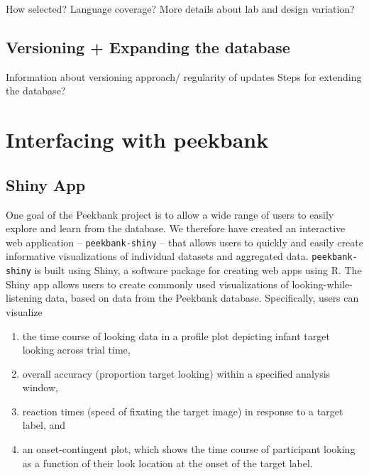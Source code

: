 \documentclass[
  english,
  man,floatsintext]{apa6}
\providecommand{\tightlist}{%
  \setlength{\itemsep}{0pt}\setlength{\parskip}{0pt}}
\begin{document}
How selected?
Language coverage?
More details about lab and design variation?

\hypertarget{versioning-expanding-the-database}{%
\subsection{Versioning + Expanding the database}\label{versioning-expanding-the-database}}

Information about versioning approach/ regularity of updates Steps for extending the database?

\hypertarget{interfacing-with-peekbank}{%
\section{Interfacing with peekbank}\label{interfacing-with-peekbank}}

\hypertarget{shiny-app}{%
\subsection{Shiny App}\label{shiny-app}}

One goal of the Peekbank project is to allow a wide range of users to easily explore and learn from the database.
We therefore have created an interactive web application -- \texttt{peekbank-shiny} -- that allows users to quickly and easily create informative visualizations of individual datasets and aggregated data.
\texttt{peekbank-shiny} is built using Shiny, a software package for creating web apps using R.
The Shiny app allows users to create commonly used visualizations of looking-while-listening data, based on data from the Peekbank database.
Specifically, users can visualize

\begin{enumerate}
\def\labelenumi{\arabic{enumi}.}
\tightlist
\item
  the time course of looking data in a profile plot depicting infant target looking across trial time,
\item
  overall accuracy (proportion target looking) within a specified analysis window,
\item
  reaction times (speed of fixating the target image) in response to a target label, and
\item
  an onset-contingent plot, which shows the time course of participant looking as a function of their look location at the onset of the target label.
\end{enumerate}
\end{document}
